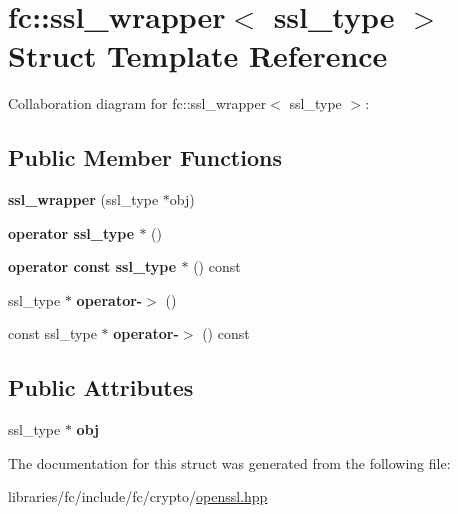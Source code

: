 \hypertarget{structfc_1_1ssl__wrapper}{}\section{fc\+:\+:ssl\+\_\+wrapper$<$ ssl\+\_\+type $>$ Struct Template Reference}
\label{structfc_1_1ssl__wrapper}


Collaboration diagram for fc\+:\+:ssl\+\_\+wrapper$<$ ssl\+\_\+type $>$\+:
\subsection*{Public Member Functions}
\begin{DoxyCompactItemize}
\item 
\mbox{\label{structfc_1_1ssl__wrapper_aa4d9c90bf8249d05161c0970985ac932}} 
{\bfseries ssl\+\_\+wrapper} (ssl\+\_\+type $\ast$obj)
\item 
\mbox{\label{structfc_1_1ssl__wrapper_acdf3448c036a48686cd098d52be8b982}} 
{\bfseries operator ssl\+\_\+type $\ast$} ()
\item 
\mbox{\label{structfc_1_1ssl__wrapper_a5fbccf113824c9904bb1cb86e57eac2a}} 
{\bfseries operator const ssl\+\_\+type $\ast$} () const
\item 
\mbox{\label{structfc_1_1ssl__wrapper_ac4a546f41e95361042ddf0ca87cb38e1}} 
ssl\+\_\+type $\ast$ {\bfseries operator-\/$>$} ()
\item 
\mbox{\label{structfc_1_1ssl__wrapper_a443ccf97d9ca7365c2638295a41e9d44}} 
const ssl\+\_\+type $\ast$ {\bfseries operator-\/$>$} () const
\end{DoxyCompactItemize}
\subsection*{Public Attributes}
\begin{DoxyCompactItemize}
\item 
\mbox{\label{structfc_1_1ssl__wrapper_af517281239c6c54085bc526c8a2b425c}} 
ssl\+\_\+type $\ast$ {\bfseries obj}
\end{DoxyCompactItemize}


The documentation for this struct was generated from the following file\+:\begin{DoxyCompactItemize}
\item 
libraries/fc/include/fc/crypto/\mbox{\hyperlink{openssl_8hpp}{openssl.\+hpp}}\end{DoxyCompactItemize}
